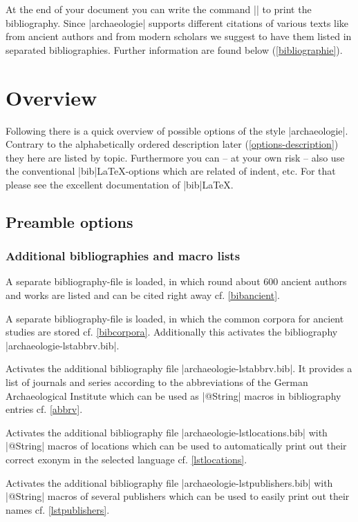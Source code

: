 \documentclass[a4paper,
10pt,
greek,
french,
spanish,
italian,
ngerman,
english
]{ltxdoc}
\begin{document}
At the end of your document you can write the command |\printbibliography| to print 
the bibliography. 
Since |archaeologie| supports different citations of various texts like from ancient authors and from modern scholars we suggest to have them listed in separated bibliographies. 
Further information are found below   (\cref{bibliographie}).

\section{Overview}\label{overview}
Following there is a quick overview of possible options of the style |archaeologie|. Contrary to the alphabetically ordered description later (\cref{options-description}) they here are listed by topic.
Furthermore you can -- at your own risk -- also use the conventional |bib|\LaTeX-options which are related of indent, etc. 
For that please see the excellent documentation of  |bib|\LaTeX.

\subsection{Preamble options}\label{preamble_options}
\subsubsection{Additional bibliographies and macro lists}
A separate bibliography-file is loaded, in which round about 600 ancient authors and works are listed and can be cited right away cf. \cref{bibancient}.

A separate bibliography-file is loaded, in which the common corpora for ancient studies are stored cf. \cref{bibcorpora}.
Additionally this activates the bibliography |archaeologie-lstabbrv.bib|.

Activates the additional bibliography file |archaeologie-lstabbrv.bib|.
It provides a list of journals and series according to the abbreviations of the German Archaeological Institute which can be used as |@String| macros in bibliography entries cf. \cref{abbrv}. 

Activates the additional bibliography file |archaeologie-lstlocations.bib|
with |@String| macros of locations which can be used to automatically print out their correct exonym in the selected language cf. \cref{lstlocations}.

Activates the additional bibliography file |archaeologie-lstpublishers.bib| with |@String| macros of several publishers which can be used to easily print out their names cf. \cref{lstpublishers}.
\end{document}
